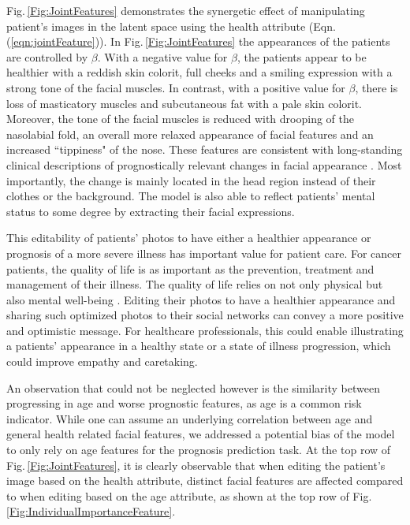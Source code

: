 \documentclass[runningheads]{llncs}
\newcommand{\vw}{\boldsymbol{w}}
\begin{document}
Fig.\,\ref{Fig:JointFeatures} demonstrates the synergetic effect of manipulating patient's images in the latent space using the health attribute
 (Eqn.\,(\ref{eqn:jointFeature})). In Fig.\,\ref{Fig:JointFeatures} the appearances of the patients are controlled by $\beta$. With a negative value for $\beta$, the patients appear to be healthier with a reddish skin colorit, full cheeks and a smiling expression with a strong tone of the facial muscles.
 In contrast, with a positive value for $\beta$, there is loss of masticatory muscles and subcutaneous fat with a pale skin colorit. Moreover, the tone of the facial muscles is reduced with drooping of the nasolabial fold, an overall more relaxed appearance of facial features and an increased ``tippiness" of the nose. These features are consistent with long-standing clinical descriptions of prognostically relevant changes in facial appearance \cite{hui2015diagnostic, withington2005hippocratic}. Most importantly, the change is mainly located in the head region instead of their clothes or the background. The model is also able to reflect patients' mental status to some degree by extracting their facial expressions.
 
 This editability of patients' photos to have either a healthier appearance or prognosis of a more severe illness has important value for patient care. For cancer patients, the quality of life is as important as the prevention, treatment and management of their illness. The quality of life relies on not only physical but also mental well-being \cite{rankin2003perceived,de2017quality}. Editing their photos to have a healthier appearance and sharing such optimized photos to their social networks can convey a more positive and optimistic message. For healthcare professionals, this could enable illustrating a patients' appearance in a healthy state or a state of illness progression, which could improve empathy and caretaking.
 
 An observation that could not be neglected however is the similarity between progressing in age and worse prognostic features, as age is a common risk indicator. While one can assume an underlying correlation between age and general health related facial features, we addressed a potential bias of the model to only rely on age features for the prognosis prediction task. 
 At the top row of Fig.\,\ref{Fig:JointFeatures}, it is clearly observable that when editing the patient's image based on the health attribute, distinct facial features are affected compared to when editing based on the age attribute, as shown at the top row of Fig.\,\ref{Fig:IndividualImportanceFeature}.
 
\end{document}
